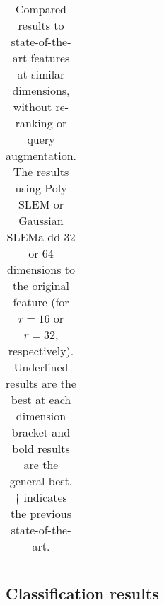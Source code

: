 \begin{table}[t]
\begin{center}
\begin{tabular}{l|c|ll}
\hline 
\end{tabular}
\caption{Compared results to state-of-the-art features at similar dimensions, without re-ranking or query augmentation. The results using Poly SLEM or Gaussian SLEMa dd 32 or 64 dimensions to the original feature (for $r=16$ or $r=32$, respectively). Underlined results are the best at each dimension bracket and bold results are the general best. $\dag$ indicates the previous state-of-the-art.}
\end{center}
\label{sota:results}
\end{table}


\subsection{Classification results}
